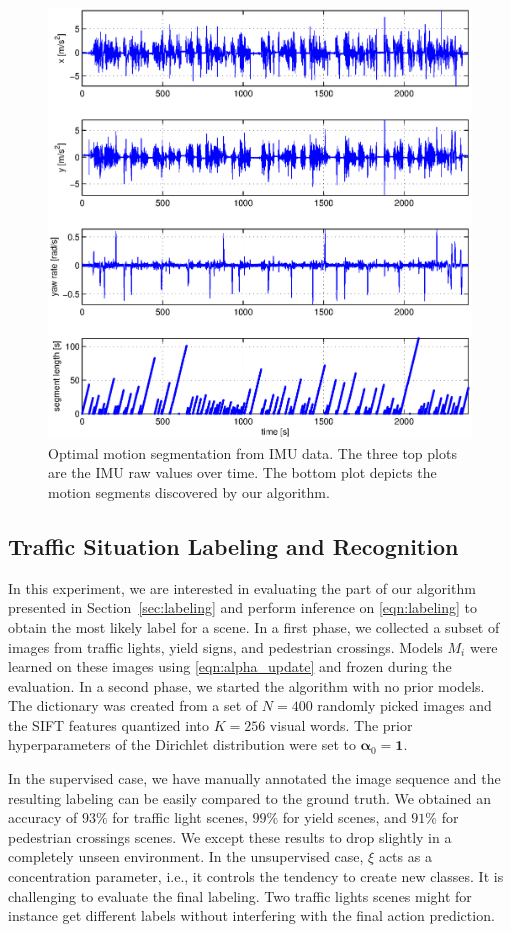 \begin{figure}[t]
\centering
\includegraphics[width=0.8\columnwidth]{fig/cpResult.eps}
\caption{Optimal motion segmentation from IMU data. The three top plots are the
IMU raw values over time. The bottom plot depicts the motion segments
discovered by our algorithm.}
\label{fig:motion_segments}
\end{figure}

\subsection{Traffic Situation Labeling and Recognition}
In this experiment, we are interested in evaluating the part of our algorithm
presented in Section~\ref{sec:labeling} and perform inference on
\eqref{eqn:labeling} to obtain the most likely label for a scene. In a first
phase, we collected a subset of images from traffic lights, yield signs, and
pedestrian crossings. Models $M_i$ were learned on these images using
\eqref{eqn:alpha_update} and frozen during the evaluation. In a second phase,
we started the algorithm with no prior models. The dictionary was created from a
set of $N=400$ randomly picked images and the SIFT features quantized into
$K=256$ visual words. The prior hyperparameters of the Dirichlet distribution
were set to $\boldsymbol{\alpha}_0=\mathbf{1}$.

In the supervised case, we have manually annotated the image sequence and the
resulting labeling can be easily compared to the ground truth. We obtained an
accuracy of $93\%$ for traffic light scenes, $99\%$ for yield scenes, and
$91\%$ for pedestrian crossings scenes. We except these results to drop slightly
in a completely unseen environment. In the unsupervised case, $\xi$ acts as a
concentration parameter, i.e., it controls the tendency to create new classes.
It is challenging to evaluate the final labeling. Two traffic lights
scenes might for instance get different labels without interfering with the
final action prediction.

